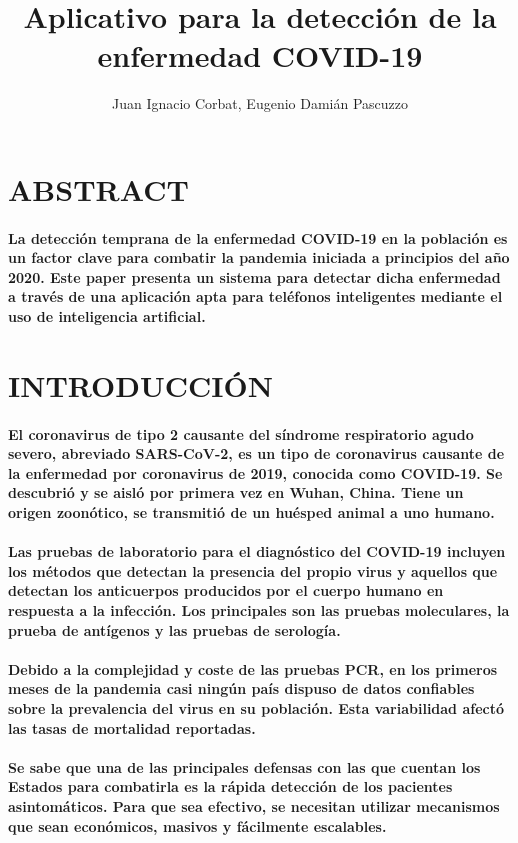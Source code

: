 \documentclass[a4paper,11pt,twocolumn]{article}
\title{Aplicativo para la detección de la enfermedad COVID-19}
\author{Juan Ignacio Corbat, Eugenio Damián Pascuzzo}
\newcommand{\sectionformat}{\centering}
\begin{document}
\maketitle
\section{\sectionformat ABSTRACT}
\paragraph{La detección temprana de la enfermedad COVID-19 en la población es un factor clave para combatir la pandemia iniciada a principios del año 2020. Este paper presenta un sistema para detectar dicha enfermedad a través de una aplicación apta para teléfonos inteligentes mediante el uso de inteligencia artificial.}
\section{\sectionformat INTRODUCCIÓN}
\paragraph{El coronavirus de tipo 2 causante del síndrome respiratorio agudo severo, abreviado SARS-CoV-2, es un tipo de coronavirus causante de la enfermedad por coronavirus de 2019, conocida como COVID-19. Se descubrió y se aisló por primera vez en Wuhan, China. Tiene un origen zoonótico, se transmitió de un huésped animal a uno humano\cite{covid-19-definición}.}
\paragraph{Las pruebas de laboratorio para el diagnóstico del COVID-19 incluyen los métodos que detectan la presencia del propio virus y aquellos que detectan los anticuerpos producidos por el cuerpo humano en respuesta a la infección. Los principales son las pruebas moleculares, la prueba de antígenos y las pruebas de serología.}
\paragraph{Debido a la complejidad y coste de las pruebas PCR, en los primeros meses de la pandemia casi ningún país dispuso de datos confiables sobre la prevalencia del virus en su población. Esta variabilidad afectó las tasas de mortalidad reportadas\cite{covid-19-overview}.}
\paragraph{Se sabe que una de las principales defensas con las que cuentan los Estados para combatirla es la rápida detección de los pacientes asintomáticos. Para que sea efectivo, se necesitan utilizar mecanismos que sean económicos, masivos y fácilmente escalables.}
\end{document}
